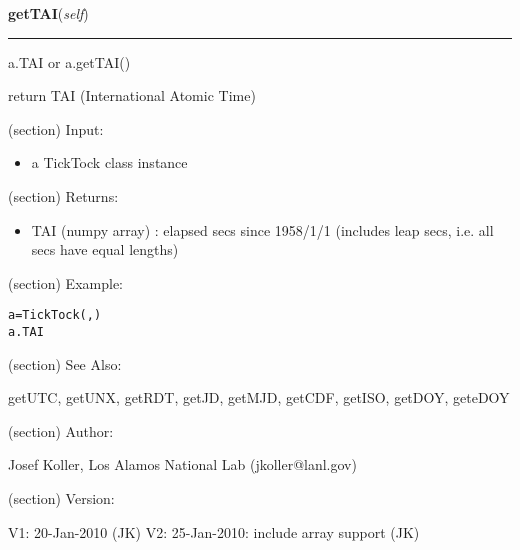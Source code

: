     \label{spacepy:spacetime:TickTock:getTAI}

    \vspace{0.5ex}

\hspace{.8\funcindent}\begin{boxedminipage}{\funcwidth}

    \raggedright \textbf{getTAI}(\textit{self})

    \vspace{-1.5ex}

    \rule{\textwidth}{0.5\fboxrule}
\setlength{\parskip}{2ex}
    a.TAI or a.getTAI()

    return TAI (International Atomic Time)

    (section) Input:

      \begin{itemize}
      \setlength{\parskip}{0.6ex}
        \item a TickTock class instance

      \end{itemize}

    (section) Returns:

      \begin{itemize}
      \setlength{\parskip}{0.6ex}
        \item TAI (numpy array) : elapsed secs since 1958/1/1 (includes leap 
          secs, i.e. all secs have equal lengths)

      \end{itemize}

    (section) Example:

\begin{alltt}
\pysrcprompt{{\textgreater}{\textgreater}{\textgreater} }a = TickTock(, )
\pysrcprompt{{\textgreater}{\textgreater}{\textgreater} }a.TAI
\end{alltt}
    (section) See Also:

      getUTC, getUNX, getRDT, getJD, getMJD, getCDF, getISO, getDOY, 
      geteDOY

    (section) Author:

      Josef Koller, Los Alamos National Lab (jkoller@lanl.gov)

    (section) Version:

      V1: 20-Jan-2010 (JK) V2: 25-Jan-2010: include array support (JK)

\setlength{\parskip}{1ex}
    \end{boxedminipage}

